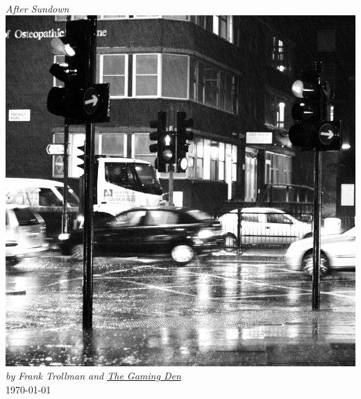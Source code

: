 \documentclass[12pt,oneside,onecolumn,openany,final]{memoir}
\begin{document}
\thispagestyle{empty}
\pagecolor{black}
\begin{center}
{\textsc{\Large}\\[0.95cm]
\color{red}
\fontsize{50}{30} \selectfont \textit{After Sundown}\\[.65cm]
\vfill
\includegraphics[width=\linewidth]{gagilas_city-blue.jpg}
\fontsize{12}{14} \selectfont
\textit{by Frank Trollman and \href{http://www.tgdmb.com/viewforum.php?f=1}{The Gaming Den}}\\
\today}
\end{center}


\pagebreak
\pagecolor{white}
\pagestyle{plain}
\sffamily
\raggedbottom
\setcounter{secnumdepth}{1}
\setcounter{tocdepth}{2}
\renewcommand{\contentsname}{Table of Contents}
\tableofcontents
\end{document}
